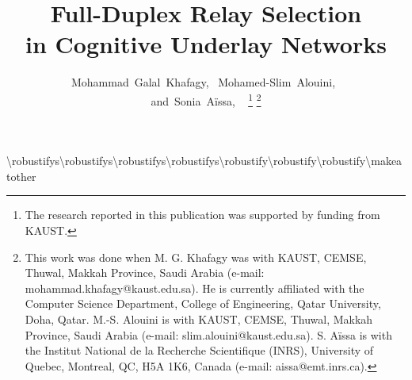 \documentclass[10pt,journal]{IEEEtran}
\begin{document}
\title{Full-Duplex Relay Selection \\in Cognitive Underlay Networks}
\author{Mohammad~Galal~Khafagy,~
        Mohamed-Slim~Alouini,~
        \\and~Sonia~A\"issa, ~ \vspace{-4mm}
\thanks{The research reported in this publication was supported by funding from \ac{KAUST}.} 
\thanks{This work was done when M. G. Khafagy was with \ac{KAUST}, \ac{CEMSE}, Thuwal, Makkah Province, Saudi Arabia (e-mail: mohammad.khafagy@kaust.edu.sa). He is currently affiliated with the Computer Science Department, College of Engineering, Qatar University, Doha, Qatar. M.-S. Alouini is with \ac{KAUST}, \ac{CEMSE}, Thuwal, Makkah Province, Saudi Arabia (e-mail: slim.alouini@kaust.edu.sa). S. A\"issa is with the Institut National de la Recherche Scientifique (INRS), University of Quebec, Montreal, QC, H5A 1K6, Canada (e-mail: aissa@emt.inrs.ca).}
}
\maketitle

\makeatletter
\newif\ifAC@uppercase@first%
\def\Aclp#1{\AC@uppercase@firsttrue\aclp{#1}\AC@uppercase@firstfalse}%
\def\AC@aclp#1{%
  \ifcsname fn@#1@PL\endcsname%
    \ifAC@uppercase@first%
      \expandafter\expandafter\expandafter\MakeUppercase\csname fn@#1@PL\endcsname%
    \else%
      \csname fn@#1@PL\endcsname%
    \fi%
  \else%
    \AC@acl{#1}s%
  \fi%
}%
\def\Acp#1{\AC@uppercase@firsttrue\acp{#1}\AC@uppercase@firstfalse}%
\def\AC@acp#1{%
  \ifcsname fn@#1@PL\endcsname%
    \ifAC@uppercase@first%
      \expandafter\expandafter\expandafter\MakeUppercase\csname fn@#1@PL\endcsname%
    \else%
      \csname fn@#1@PL\endcsname%
    \fi%
  \else%
    \AC@ac{#1}s%
  \fi%
}%
\def\Acfp#1{\AC@uppercase@firsttrue\acfp{#1}\AC@uppercase@firstfalse}%
\def\AC@acfp#1{%
  \ifcsname fn@#1@PL\endcsname%
    \ifAC@uppercase@first%
      \expandafter\expandafter\expandafter\MakeUppercase\csname fn@#1@PL\endcsname%
    \else%
      \csname fn@#1@PL\endcsname%
    \fi%
  \else%
    \AC@acf{#1}s%
  \fi%
}%
\def\Acsp#1{\AC@uppercase@firsttrue\acsp{#1}\AC@uppercase@firstfalse}%
\def\AC@acsp#1{%
  \ifcsname fn@#1@PL\endcsname%
    \ifAC@uppercase@first%
      \expandafter\expandafter\expandafter\MakeUppercase\csname fn@#1@PL\endcsname%
    \else%
      \csname fn@#1@PL\endcsname%
    \fi%
  \else%
    \AC@acs{#1}s%
  \fi%
}%
\edef\AC@uppercase@write{\string\ifAC@uppercase@first\string\expandafter\string\MakeUppercase\string\fi\space}%
\def\AC@acrodef#1[#2]#3{%
  \@bsphack%
  \protected@write\@auxout{}{%
    \string\newacro{#1}[#2]{\AC@uppercase@write #3}%
  }\@esphack%
}%
\def\Acl#1{\AC@uppercase@firsttrue\acl{#1}\AC@uppercase@firstfalse}
\def\Acf#1{\AC@uppercase@firsttrue\acf{#1}\AC@uppercase@firstfalse}
\def\Ac#1{\AC@uppercase@firsttrue\ac{#1}\AC@uppercase@firstfalse}
\def\Acs#1{\AC@uppercase@firsttrue\acs{#1}\AC@uppercase@firstfalse}
\robustify\Aclp
\robustify\Acfp
\robustify\Acp
\robustify\Acsp
\robustify\Acl
\robustify\Acf
\robustify\Ac
\robustify\Acs
\makeatother
\end{document}
